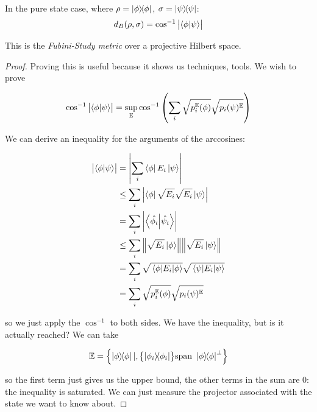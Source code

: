 \documentclass[main.tex]{subfiles}
\begin{document}
\begin{claim}
    In the pure state case, where \(\rho = \ketbra{\phi}\), \(\sigma = \ketbra{\psi}\):
    \begin{equation} \label{eq:fubini-study-metric}
        d_B (\rho, \sigma) = \cos^{-1} \abs{\braket{\phi}{\psi}}
    \end{equation}
\end{claim}

This is the \emph{Fubini-Study metric} over a projective Hilbert space.

\begin{proof}

Proving this is useful because it shows us techniques, tools.
We wish to prove

\begin{equation}
  \cos ^{-1} \abs{\braket{\phi}{\psi}}
  = \sup_{\mathbb E}
  \cos ^{-1} \qty(\sum_i \sqrt{p_i ^{\mathbb{E}} (\phi)} \sqrt{p_i(\psi)^{\mathbb{E}}})
\end{equation}

We can derive an inequality for the arguments of the arccosines:

\begin{subequations}
\begin{align}
  \abs{\braket{\phi}{\psi}} &= \abs{\sum_i \bra{\phi} E_i \ket{\psi}}  \\
  &\leq \sum_i \abs{\bra{\phi} \sqrt{E _{i} } \sqrt{E _{i}} \ket{\psi}}  \\
  &= \sum _{i} \abs{\braket{\hat{\phi_i}}{\hat{\psi_i}}}  \\
  &\leq \sum_i \norm{\sqrt{E_i} \ket{\phi}}\norm{\sqrt{E_i} \ket{\psi}}  \\
  &= \sum_i \sqrt{\ev{E_i}{\phi}} \sqrt{\ev{E_i}{\psi}}  \\
  &= \sum_i \sqrt{p_i ^{\mathbb{E}} (\phi)} \sqrt{p_i(\psi)^{\mathbb{E}}}
\end{align}
\end{subequations}

so we just apply the \( \cos ^{-1} \) to both sides. We have the inequality, but is it actually reached? We can take

\begin{equation}
  \mathbb{E} = \qty{\ketbra{\phi} | , \qty{\ketbra{\phi_i}} \text{span } \ketbra{\phi}^{\perp}}
\end{equation}

so the first term just gives us the upper bound, the other terms in the sum are 0: the inequality is saturated. We can just measure the projector associated with the state we want to know about.
\end{proof}
\end{document}

